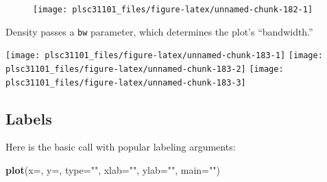 \documentclass[
]{book}
\newenvironment{Shaded}{\begin{snugshade}}{\end{snugshade}}
\newcommand{\CommentTok}[1]{\textcolor[rgb]{0.56,0.35,0.01}{\textit{#1}}}
\newcommand{\DataTypeTok}[1]{\textcolor[rgb]{0.13,0.29,0.53}{#1}}
\newcommand{\DecValTok}[1]{\textcolor[rgb]{0.00,0.00,0.81}{#1}}
\newcommand{\KeywordTok}[1]{\textcolor[rgb]{0.13,0.29,0.53}{\textbf{#1}}}
\newcommand{\NormalTok}[1]{#1}
\newcommand{\OperatorTok}[1]{\textcolor[rgb]{0.81,0.36,0.00}{\textbf{#1}}}
\newcommand{\StringTok}[1]{\textcolor[rgb]{0.31,0.60,0.02}{#1}}
\begin{document}
\begin{figure}

{\centering \texttt{[image: plsc31101\_files/figure-latex/unnamed-chunk-182-1]} 

}

\caption{ }\label{fig:unnamed-chunk-182}
\end{figure}

Density passes a \texttt{bw} parameter, which determines the plot's ``bandwidth.''

\begin{Shaded}
\end{Shaded}

\begin{center}\texttt{[image: plsc31101\_files/figure-latex/unnamed-chunk-183-1]} \texttt{[image: plsc31101\_files/figure-latex/unnamed-chunk-183-2]} \texttt{[image: plsc31101\_files/figure-latex/unnamed-chunk-183-3]} \end{center}

\hypertarget{labels}{%
\subsection{Labels}\label{labels}}

Here is the basic call with popular labeling arguments:

\begin{Shaded}
\begin{Highlighting}[]
\KeywordTok{plot}\NormalTok{(}\DataTypeTok{x=}\NormalTok{, }\DataTypeTok{y=}\NormalTok{, }\DataTypeTok{type=}\StringTok{""}\NormalTok{, }\DataTypeTok{xlab=}\StringTok{""}\NormalTok{, }\DataTypeTok{ylab=}\StringTok{""}\NormalTok{, }\DataTypeTok{main=}\StringTok{""}\NormalTok{) }
\end{Highlighting}
\end{Shaded}
\end{document}
